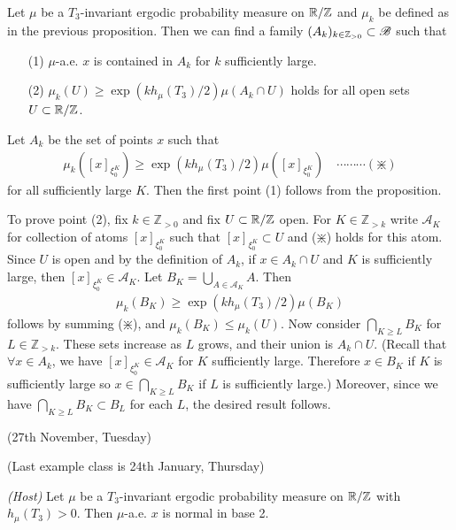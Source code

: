 \documentclass[12pt,a4paper]{report}
\newenvironment{proof}
{\begin{changemargin}{1cm}{0.5cm} 
	}%
	{\end{changemargin}
}
\begin{document}
\cor Let $\mu$ be a $T_3$-invariant ergodic probability measure on $\mathbb{R}/\mathbb{Z}$ and $\mu_k$ be defined as in the previous proposition. Then we can find a family $(A_{k})_{k\in \mathbb{Z}_{>0}} \subset \mathscr{B}$ such that
\begin{itemize}
\item[(1)] $\mu$-a.e. $x$ is contained in $A_k$ for $k$ sufficiently large.
\item[(2)] $\mu_k(U) \geq \exp(k h_{\mu}(T_3)/2) \mu(A_k \cap U)$ holds for all open sets $U\subset \mathbb{R}/\mathbb{Z}$.
\end{itemize}
\begin{proof}
\pf Let $A_k$ be the set of points $x$ such that
\begin{align*}
\mu_k([x]_{\xi_0^K}) \geq \exp(k h_{\mu}(T_3)/2) \mu([x]_{\xi_0^K}) \quad \cdots\cdots\cdots (\divideontimes)
\end{align*}
for all sufficiently large $K$. Then the first point (1) follows from the proposition. 

\quad To prove point (2), fix $k\in \mathbb{Z}_{>0}$ and fix $U\subset \mathbb{R}/\mathbb{Z}$ open. For $K\in \mathbb{Z}_{>k}$ write $\mathscr{A}_K$ for collection of atoms $[x]_{\xi_0^K}$ such that $[x]_{\xi_0^K} \subset U$ and ($\divideontimes$) holds for this atom. Since $U$ is open and by the definition of $A_k$, if $x\in A_k \cap U$ and $K$ is sufficiently large, then $[x]_{\xi_0^K} \in \mathscr{A}_K$. Let $B_K = \bigcup_{A\in \mathscr{A}_K} A$. Then
\begin{align*}
\mu_k(B_K) \geq \exp (k h_{\mu}(T_3)/2) \mu(B_K)
\end{align*}
follows by summing ($\divideontimes$), and $\mu_k(B_K) \leq \mu_k(U)$. Now consider $\bigcap_{K\geq L} B_K$ for $L \in \mathbb{Z}_{>k}$. These sets increase as $L$ grows, and their union is $A_k \cap U$. (Recall that $\forall x\in A_k$, we have $[x]_{\xi_0^K} \in \mathscr{A}_K$ for $K$ sufficiently large. Therefore $x\in B_K$ if $K$ is sufficiently large so $x\in \bigcap_{K \geq L} B_K$ if $L$ is sufficiently large.) Moreover, since we have $\bigcap_{K\geq L} B_K \subset B_L$ for each $L$, the desired result follows.
\s

\eop
\end{proof}
\s

\newday

(27th November, Tuesday)
\s

(Last example class is 24th January, Thursday)
\s

\thm \emph{(Host)} Let $\mu$ be a $T_3$-invariant ergodic probability measure on $\mathbb{R}/ \mathbb{Z}$ with $h_{\mu}(T_3)>0$. Then $\mu$-a.e. $x$ is normal in base 2.
\end{document}
